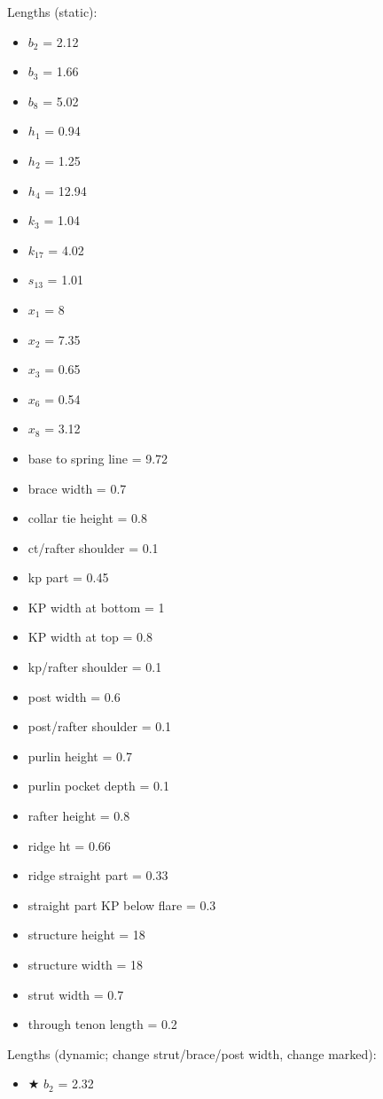 \documentclass{article}\usepackage[]{graphicx}\usepackage[]{xcolor}
\begin{document}
\begin{multicols}{2}
Lengths (static):
\begin{itemize}
  \item $b_2$ = 2.12
  \item $b_3$ = 1.66
  \item $b_8$ = 5.02
  \item $h_1$ = 0.94
  \item $h_2$ = 1.25
  \item $h_4$ = 12.94
  \item $k_3$ = 1.04
  \item $k_{17}$ = 4.02
  \item $s_{13}$ = 1.01
  \item $x_1$ = 8
  \item $x_2$ = 7.35
  \item $x_3$ = 0.65
  \item $x_6$ = 0.54
  \item $x_8$ = 3.12
  \item base to spring line = 9.72
  \item brace width = 0.7
  \item collar tie height = 0.8
  \item ct/rafter shoulder = 0.1
  \item kp part = 0.45
  \item KP width at bottom = 1
  \item KP width at top = 0.8
  \item kp/rafter shoulder = 0.1
  \item post width = 0.6
  \item post/rafter shoulder = 0.1
  \item purlin height = 0.7
  \item purlin pocket depth = 0.1
  \item rafter height = 0.8
  \item ridge ht = 0.66
  \item ridge straight part = 0.33
  \item straight part KP below flare = 0.3
  \item structure height = 18
  \item structure width = 18
  \item strut width = 0.7
  \item through tenon length = 0.2
\end{itemize}
\columnbreak
Lengths (dynamic; change strut/brace/post width, change marked):
\begin{itemize}
  \item $\bigstar$ $b_2$ = 2.32

\end{itemize}
\end{multicols}
\end{document}
